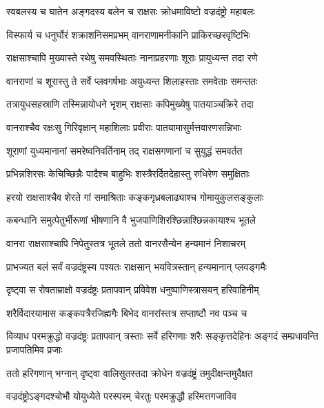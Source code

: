 
\twolineshloka
{स्वबलस्य च घातेन अङ्गदस्य बलेन च}
{राक्षसः क्रोधमाविष्टो वज्रदंष्ट्रो महाबलः} %

\twolineshloka
{विस्फार्य च धनुर्घोरं शक्राशनिसमप्रभम्}
{वानराणामनीकानि प्राकिरच्छरवृष्टिभिः} %

\twolineshloka
{राक्षसाश्चापि मुख्यास्ते रथेषु समवस्थिताः}
{नानाप्रहरणाः शूराः प्रायुध्यन्त तदा रणे} %

\twolineshloka
{वानराणां च शूरास्तु ते सर्वे प्लवगर्षभाः}
{अयुध्यन्त शिलाहस्ताः समवेताः समन्ततः} %

\twolineshloka
{तत्रायुधसहस्राणि तस्मिन्नायोधने भृशम्}
{राक्षसाः कपिमुख्येषु पातयाञ्चक्रिरे तदा} %

\twolineshloka
{वानराश्चैव रक्षःसु गिरिवृक्षान् महाशिलाः}
{प्रवीराः पातयामासुर्मत्तवारणसन्निभाः} %

\twolineshloka
{शूराणां युध्यमानानां समरेष्वनिवर्तिनाम्}
{तद् राक्षसगणानां च सुयुद्धं समवर्तत} %

\twolineshloka
{प्रभिन्नशिरसः केचिच्छिन्नैः पादैश्च बाहुभिः}
{शस्त्रैरर्दितदेहास्तु रुधिरेण समुक्षिताः} %

\twolineshloka
{हरयो राक्षसाश्चैव शेरते गां समाश्रिताः}
{कङ्कगृध्रबलाढ्याश्च गोमायुकुलसङ्कुलाः} %

\twolineshloka
{कबन्धानि समुत्पेतुर्भीरूणां भीषणानि वै}
{भुजपाणिशिरश्छिन्नाश्छिन्नकायाश्च भूतले} %

\twolineshloka
{वानरा राक्षसाश्चापि निपेतुस्तत्र भूतले}
{ततो वानरसैन्येन हन्यमानं निशाचरम्} %

\twolineshloka
{प्राभज्यत बलं सर्वं वज्रदंष्ट्रस्य पश्यतः}
{राक्षसान् भयवित्रस्तान् हन्यमानान् प्लवङ्गमैः} %

\twolineshloka
{दृष्ट्वा स रोषताम्राक्षो वज्रदंष्ट्रः प्रतापवान्}
{प्रविवेश धनुष्पाणिस्त्रासयन् हरिवाहिनीम्} %

\twolineshloka
{शरैर्विदारयामास कङ्कपत्रैरजिह्मगैः}
{बिभेद वानरांस्तत्र सप्ताष्टौ नव पञ्च च} %

\threelineshloka
{विव्याध परमक्रुद्धो वज्रदंष्ट्रः प्रतापवान्}
{त्रस्ताः सर्वे हरिगणाः शरैः सङ्कृत्तदेहिनः}
{अङ्गदं सम्प्रधावन्ति प्रजापतिमिव प्रजाः} %

\twolineshloka
{ततो हरिगणान् भग्नान् दृष्ट्वा वालिसुतस्तदा}
{क्रोधेन वज्रदंष्ट्रं तमुदीक्षन्तमुदैक्षत} %

\twolineshloka
{वज्रदंष्ट्रोऽङ्गदश्चोभौ योयुध्येते परस्परम्}
{चेरतुः परमक्रुद्धौ हरिमत्तगजाविव} %

